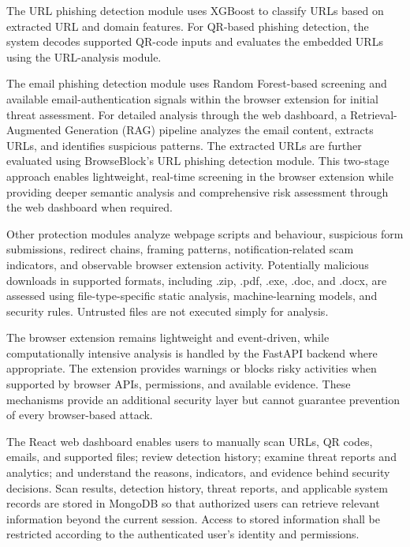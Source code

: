 \documentclass[12pt,a4paper]{report}
\begin{document}
The URL phishing detection module uses XGBoost to classify URLs based on extracted URL and domain features. For QR-based phishing detection, the system decodes supported QR-code inputs and evaluates the embedded URLs using the URL-analysis module.\par

The email phishing detection module uses Random Forest-based screening and available email-authentication signals within the browser extension for initial threat assessment. For detailed analysis through the web dashboard, a Retrieval-Augmented Generation (RAG) pipeline analyzes the email content, extracts URLs, and identifies suspicious patterns. The extracted URLs are further evaluated using BrowseBlock’s URL phishing detection module. This two-stage approach enables lightweight, real-time screening in the browser extension while providing deeper semantic analysis and comprehensive risk assessment through the web dashboard when required.\par

Other protection modules analyze webpage scripts and behaviour, suspicious form submissions, redirect chains, framing patterns, notification-related scam indicators, and observable browser extension activity. Potentially malicious downloads in supported formats, including .zip, .pdf, .exe, .doc, and .docx, are assessed using file-type-specific static analysis, machine-learning models, and security rules. Untrusted files are not executed simply for analysis.\par

The browser extension remains lightweight and event-driven, while computationally intensive analysis is handled by the FastAPI backend where appropriate. The extension provides warnings or blocks risky activities when supported by browser APIs, permissions, and available evidence. These mechanisms provide an additional security layer but cannot guarantee prevention of every browser-based attack.\par

The React web dashboard enables users to manually scan URLs, QR codes, emails, and supported files; review detection history; examine threat reports and analytics; and understand the reasons, indicators, and evidence behind security decisions. Scan results, detection history, threat reports, and applicable system records are stored in MongoDB so that authorized users can retrieve relevant information beyond the current session. Access to stored information shall be restricted according to the authenticated user's identity and permissions.\par
\end{document}
